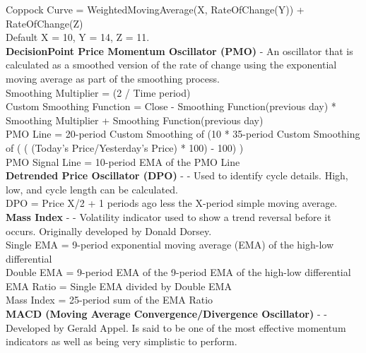 \documentclass[12pt,a4paper]{article}
\begin{document}
\noindent
Coppock Curve = WeightedMovingAverage(X, RateOfChange(Y)) + RateOfChange(Z)\\
Default X = 10, Y = 14, Z = 11. \\

\iffalse
[]
\fi

\noindent
\textbf{DecisionPoint Price Momentum Oscillator (PMO)} - An oscillator that is calculated as a smoothed version of the rate of change using the exponential moving average as part of the smoothing process. \\

\noindent
Smoothing Multiplier = (2 / Time period)\\
Custom Smoothing Function = {Close - Smoothing Function(previous day)} * Smoothing Multiplier + Smoothing Function(previous day) \\
PMO Line = 20-period Custom Smoothing of (10 * 35-period Custom Smoothing of ( ( (Today's Price/Yesterday's Price) * 100) - 100) )\\
PMO Signal Line = 10-period EMA of the PMO Line\\

\iffalse
[]
\fi

\noindent
\textbf{Detrended Price Oscillator (DPO)} - \cite{Murphy1999} - Used to identify cycle details. High, low, and cycle length can be calculated.\\

\noindent
DPO = Price {X/2 + 1} periods ago less the X-period simple moving average.\\

\iffalse
[]
\fi

\noindent
\textbf{Mass Index} - \cite{Murphy1999} - Volatility indicator used to show a trend reversal before it occurs.  Originally developed by Donald Dorsey. \\

\noindent
Single EMA = 9-period exponential moving average (EMA) of the high-low differential \\
Double EMA = 9-period EMA of the 9-period EMA of the high-low differential \\
EMA Ratio = Single EMA divided by Double EMA \\
Mass Index = 25-period sum of the EMA Ratio \\

\iffalse
[]
\fi

\noindent
\textbf{MACD (Moving Average Convergence/Divergence Oscillator)} - \cite{Appel2005} - Developed by Gerald Appel. Is said to be one of the most effective momentum indicators as well as being very simplistic to perform. \\
\end{document}
